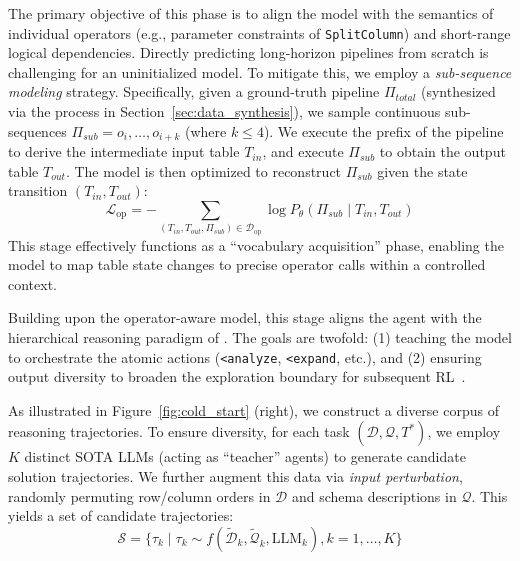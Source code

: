 The primary objective of this phase is to align the model with the semantics of individual operators (e.g., parameter constraints of \texttt{SplitColumn}) and short-range logical dependencies.
Directly predicting long-horizon pipelines from scratch is challenging for an uninitialized model. To mitigate this, we employ a \textit{sub-sequence modeling} strategy.
Specifically, given a ground-truth pipeline $\Pi_{total}$ (synthesized via the process in Section~\ref{sec:data_synthesis}), we sample continuous sub-sequences $\Pi_{sub} = {o_i, \dots, o_{i+k}}$ (where $k \le 4$).
We execute the prefix of the pipeline to derive the intermediate input table $T_{in}$, and execute $\Pi_{sub}$ to obtain the output table $T_{out}$.
The model is then optimized to reconstruct $\Pi_{sub}$ given the state transition $(T_{in}, T_{out})$:
\begin{equation}
\mathcal{L}_{\text{op}} = -\sum_{(T_{in}, T_{out}, \Pi_{sub}) \in \mathcal{D}_{\text{op}}} \log P_\theta(\Pi_{sub} \mid T_{in}, T_{out})
\end{equation}
This stage effectively functions as a ``vocabulary acquisition'' phase, enabling the model to map table state changes to precise operator calls within a controlled context.

Building upon the operator-aware model, this stage aligns the agent with the hierarchical reasoning paradigm of \sys. The goals are twofold: (1) teaching the model to orchestrate the atomic actions (\texttt{<analyze}, \texttt{<expand}, etc.), and (2) ensuring output diversity to broaden the exploration boundary for subsequent RL~\cite{guo2025deepseek}.


As illustrated in Figure~\ref{fig:cold_start} (right), we construct a diverse corpus of reasoning trajectories.
To ensure diversity, for each task $(\mathcal{D}, \mathcal{Q}, T^*)$, we employ $K$ distinct SOTA LLMs (acting as ``teacher'' agents) to generate candidate solution trajectories. We further augment this data via \textit{input perturbation}, randomly permuting row/column orders in $\mathcal{D}$ and schema descriptions in $\mathcal{Q}$. This yields a set of candidate trajectories:
\begin{equation}
\mathcal{S} = \{\tau_k \mid \tau_k \sim f(\tilde{\mathcal{D}}_k, \tilde{\mathcal{Q}}_k, \text{LLM}_k), k = 1, \dots, K\}
\end{equation}

